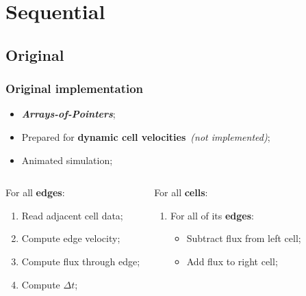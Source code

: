 \section{Sequential}

\subsection{Original}
\begin{frame}
	\frametitle{Original implementation}
	\begin{itemize}
		\item \textbf{\itshape Arrays-of-Pointers};
		\item Prepared for \textbf{dynamic cell velocities}\ \textit{(not implemented)};
		\item Animated simulation;
	\end{itemize}

	\begin{columns}
		\begin{block}{\computeflux}
			\smaller
			For all \textbf{edges}:
			\begin{enumerate}
				\item Read adjacent cell data;	
				\item Compute edge velocity;
				\item Compute flux through edge;
				\item Compute $\Delta t$;
			\end{enumerate}
		\end{block}

		\begin{block}{\update}
			\smaller
			For all \textbf{cells}:
			\begin{enumerate}
				\item For all of its \textbf{edges}:
				\begin{itemize}\smaller
					\item Subtract flux from left cell;
					\item Add flux to right cell;
				\end{itemize}
			\end{enumerate}
		\end{block}
	\end{columns}
\end{frame}

